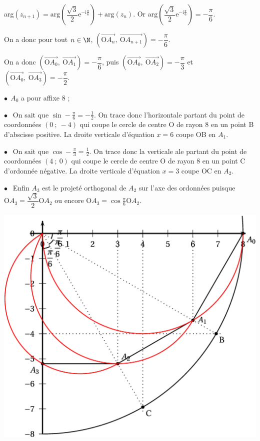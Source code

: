 \documentclass{cornouaille}
\begin{document}
arg$\left(z_{n+1} \right) = \text{arg}\left(\dfrac{\sqrt{3}}{2}\text{e}^{- \text{i}\frac{\pi}{6}}\right) + \text{arg}\left(z_n\right)$.
Or $\text{arg}\left(\dfrac{\sqrt{3}}{2}\text{e}^{- \text{i}\frac{\pi}{6}} \right) = - \dfrac{\pi}{6}$.

On a donc pour tout $n \in \N$, $\left(\overrightarrow{\text{O}A_n},~\overrightarrow{\text{O}A_{n+1}} \right) = - \dfrac{\pi}{6}$.

On a donc $\left(\overrightarrow{\text{O}A_0},~\overrightarrow{\text{O}A_{1}} \right) = - \dfrac{\pi}{6}$, puis
$\left(\overrightarrow{\text{O}A_0},~\overrightarrow{\text{O}A_{2}} \right) = - \dfrac{\pi}{3}$ et $\left(\overrightarrow{\text{O}A_0},~\overrightarrow{\text{O}A_{3}} \right) = - \dfrac{\pi}{2}$.

\smallskip

$\bullet~~$$A_0$ a pour affixe 8 ;

$\bullet~~$ On sait que $\sin - \frac{\pi}{6} = - \frac{1}{2}$. On trace donc l'horizontale partant du point de coordonnées $(0~;~- 4)$ qui coupe le cercle de centre O de rayon 8 en un point B d'abscisse positive. La droite verticale d'équation $x = 6$ coupe OB en $A_1$.

$\bullet~~$ On sait que $\cos - \frac{\pi}{3} =  \frac{1}{2}$. On trace donc la verticale ale partant du point de coordonnées $(4~;~0)$ qui coupe le cercle de centre O de rayon 8 en un point C d'ordonnée négative. La droite verticale  d'équation $x = 3$ coupe OC en $A_2$.

$\bullet~~$ Enfin $A_3$ est le projeté orthogonal de $A_2$ sur l'axe des ordonnées puisque $\text{O}A_3 = \dfrac{\sqrt{3}}{2}\text{O}A_2$ ou encore $\text{O}A_3 = \cos \frac{\pi}{6}\text{O}A_2$.



\includegraphics{./TS-Complexes-Loga-3}
\end{document}
